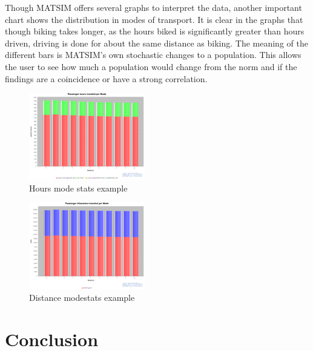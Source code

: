 \documentclass[11pt]{article}
\begin{document}
\begin{multicols}{2}
    \quad Though MATSIM offers several graphs to interpret the data, another important chart shows the distribution in modes of transport. It is clear in the graphs that though biking takes longer, as the hours biked is significantly greater than hours driven, driving is done for about the same distance as biking. The meaning of the different bars is MATSIM's own stochastic changes to a population. This allows the user to see how much a population would change from the norm and if the findings are a coincidence or have a strong correlation.

    \begin{figure}[H]
        \centering
        \includegraphics[width=0.45\textwidth]{images/phModestats.png}
        \caption{Hours mode stats example}
        \label{fig:ph-modestats}
    \end{figure}

    \begin{figure}[H]
        \centering
        \includegraphics[width=0.45\textwidth]{images/pkmModestats.png}
        \caption{Distance modestats example}
        \label{fig:pkm-modestats}
    \end{figure}

    \section{Conclusion}


\end{multicols}
\end{document}
